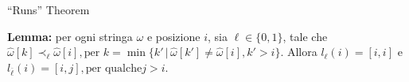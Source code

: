 \documentclass{beamer}
\begin{document}
    \begin{frame}{``Runs'' Theorem}

        \textbf{Lemma:} per ogni stringa \(\omega\) e posizione \(i\),
        sia \(\ell \in \{0, 1\} \), tale che \(\hat{\omega}[k] \prec_{\ell} 
        \hat{\omega}[i], \text{per } k = \min \{ k' \, \vert \, \hat{\omega}[k'] \ne 
        \hat{\omega}[i], k' > i\}\). Allora \(l_{\ell}(i) = [i, i]\) e 
        \(l_{\overline{\ell}}(i) = [i, j], \text{per qualche} j > i\).
    \end{frame}

\end{document}
